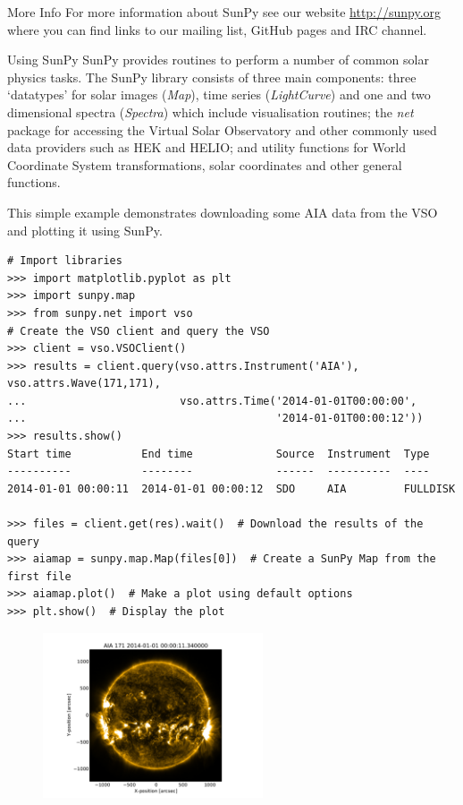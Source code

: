 \documentclass[a0paper,portrait]{baposter}
\begin{document}
\begin{poster}
\begin{posterbox}[name=acknoledgements,column=2,below=development,above=bottom]{More Info}
For more information about SunPy see our website \url{http://sunpy.org} where you can find links to our mailing list, GitHub pages and IRC channel.
\end{posterbox}

\begin{posterbox}[name=examples,span=2,column=0]{Using SunPy}
SunPy provides routines to perform a number of common solar physics tasks.
The SunPy library consists of three main components: three `datatypes' for solar images (\textit{Map}), time series (\textit{LightCurve}) and one and two dimensional spectra (\textit{Spectra}) which include visualisation routines; the \textit{net} package for accessing the Virtual Solar Observatory and other commonly used data providers such as HEK and HELIO; and utility functions for World Coordinate System transformations, solar coordinates and other general functions.

This simple example demonstrates downloading some AIA data from the VSO and plotting it using SunPy.
\begin{verbatim}
# Import libraries
>>> import matplotlib.pyplot as plt
>>> import sunpy.map
>>> from sunpy.net import vso
# Create the VSO client and query the VSO
>>> client = vso.VSOClient()
>>> results = client.query(vso.attrs.Instrument('AIA'), vso.attrs.Wave(171,171),
...                        vso.attrs.Time('2014-01-01T00:00:00',
...                                       '2014-01-01T00:00:12'))
>>> results.show()
Start time           End time             Source  Instrument  Type    
----------           --------             ------  ----------  ----    
2014-01-01 00:00:11  2014-01-01 00:00:12  SDO     AIA         FULLDISK

>>> files = client.get(res).wait()  # Download the results of the query
>>> aiamap = sunpy.map.Map(files[0])  # Create a SunPy Map from the first file
>>> aiamap.plot()  # Make a plot using default options
>>> plt.show()  # Display the plot
\end{verbatim}

\begin{figure}[H]
\centering
\includegraphics[width=0.58\textwidth]{aia_171}
\end{figure}


\end{posterbox}
\end{poster}
\end{document}
